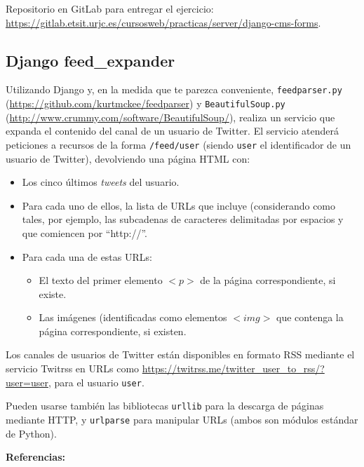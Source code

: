 Repositorio en GitLab para entregar el ejercicio: \\ 
\url{https://gitlab.etsit.urjc.es/cursosweb/practicas/server/django-cms-forms}.


\subsection{Django feed\_expander}
\label{subsec:django-feed-expander}

Utilizando Django y, en la medida que te parezca conveniente, \texttt{feedparser.py} (\url{https://github.com/kurtmckee/feedparser}) y \texttt{BeautifulSoup.py} (\url{http://www.crummy.com/software/BeautifulSoup/}), realiza un servicio que expanda el contenido del canal de un usuario de Twitter. El servicio atenderá peticiones a recursos de la forma \verb|/feed/user| (siendo  \texttt{user} el identificador de un usuario de Twitter), devolviendo una página HTML con:

\begin{itemize}
\item Los cinco últimos \emph{tweets} del usuario.
\item Para cada uno de ellos, la lista de URLs que incluye (considerando como tales, por ejemplo, las subcadenas de caracteres delimitadas por espacios y que comiencen por ``http://''.
\item Para cada una de estas URLs:
  \begin{itemize}
  \item El texto del primer elemento $<p>$ de la página correspondiente, si existe.
  \item Las imágenes (identificadas como elementos $<img>$ que contenga la página correspondiente, si existen.
  \end{itemize}
\end{itemize}

Los canales de usuarios de Twitter están disponibles en formato RSS mediante el servicio Twitrss en URLs como \url{https://twitrss.me/twitter_user_to_rss/?user=user}, para el usuario \texttt{user}.

Pueden usarse también las bibliotecas \texttt{urllib} para la descarga de páginas mediante HTTP, y \texttt{urlparse} para manipular URLs (ambos son módulos estándar de Python).

\textbf{Referencias:}

